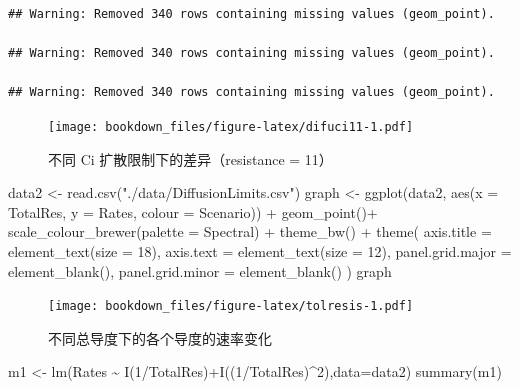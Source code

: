 \documentclass[
]{krantz}
\makeatletter
\newenvironment{Shaded}{\begin{snugshade}}{\end{snugshade}}
\newcommand{\AttributeTok}[1]{\textcolor[rgb]{0.77,0.63,0.00}{#1}}
\newcommand{\DecValTok}[1]{\textcolor[rgb]{0.00,0.00,0.81}{#1}}
\newcommand{\FunctionTok}[1]{\textcolor[rgb]{0.00,0.00,0.00}{#1}}
\newcommand{\NormalTok}[1]{#1}
\newcommand{\OtherTok}[1]{\textcolor[rgb]{0.56,0.35,0.01}{#1}}
\newcommand{\SpecialCharTok}[1]{\textcolor[rgb]{0.00,0.00,0.00}{#1}}
\newcommand{\StringTok}[1]{\textcolor[rgb]{0.31,0.60,0.02}{#1}}
\newenvironment{kframe}{%
\medskip{}
\setlength{\fboxsep}{.8em}
 \def\at@end@of@kframe{}%
 \ifinner\ifhmode%
  \def\at@end@of@kframe{\end{minipage}}%
  \begin{minipage}{\columnwidth}%
 \fi\fi%
 \def\FrameCommand##1{\hskip\@totalleftmargin \hskip-\fboxsep
 \colorbox{shadecolor}{##1}\hskip-\fboxsep
     \hskip-\linewidth \hskip-\@totalleftmargin \hskip\columnwidth}%
 \MakeFramed {\advance\hsize-\width
   \@totalleftmargin\z@ \linewidth\hsize
   \@setminipage}}%
 {\par\unskip\endMakeFramed%
 \at@end@of@kframe}
\renewenvironment{Shaded}{\begin{kframe}}{\end{kframe}}
\makeatother
\begin{document}
\begin{verbatim}
## Warning: Removed 340 rows containing missing values (geom_point).

## Warning: Removed 340 rows containing missing values (geom_point).

## Warning: Removed 340 rows containing missing values (geom_point).
\end{verbatim}

\begin{figure}
\centering
\texttt{[image: bookdown\_files/figure-latex/difuci11-1.pdf]}
\caption{\label{fig:difuci11}不同 Ci 扩散限制下的差异（resistance = 11）}
\end{figure}

\begin{Shaded}
\begin{Highlighting}[]
\NormalTok{data2 }\OtherTok{\textless{}{-}} \FunctionTok{read.csv}\NormalTok{(}\StringTok{"./data/DiffusionLimits.csv"}\NormalTok{)}
\NormalTok{graph }\OtherTok{\textless{}{-}} \FunctionTok{ggplot}\NormalTok{(data2, }\FunctionTok{aes}\NormalTok{(}\AttributeTok{x =}\NormalTok{ TotalRes, }\AttributeTok{y =}\NormalTok{ Rates, }\AttributeTok{colour =}\NormalTok{ Scenario)) }\SpecialCharTok{+}
  \FunctionTok{geom\_point}\NormalTok{()}\SpecialCharTok{+}
  \FunctionTok{scale\_colour\_brewer}\NormalTok{(}\AttributeTok{palette =} \StringTok{\textquotesingle{}Spectral\textquotesingle{}}\NormalTok{) }\SpecialCharTok{+}
  \FunctionTok{theme\_bw}\NormalTok{() }\SpecialCharTok{+}
  \FunctionTok{theme}\NormalTok{(}
    \AttributeTok{axis.title =} \FunctionTok{element\_text}\NormalTok{(}\AttributeTok{size =} \DecValTok{18}\NormalTok{),}
    \AttributeTok{axis.text =} \FunctionTok{element\_text}\NormalTok{(}\AttributeTok{size =} \DecValTok{12}\NormalTok{),}
    \AttributeTok{panel.grid.major =} \FunctionTok{element\_blank}\NormalTok{(),}
    \AttributeTok{panel.grid.minor =} \FunctionTok{element\_blank}\NormalTok{()}
\NormalTok{  )}
\NormalTok{graph}
\end{Highlighting}
\end{Shaded}

\begin{figure}
\centering
\texttt{[image: bookdown\_files/figure-latex/tolresis-1.pdf]}
\caption{\label{fig:tolresis}不同总导度下的各个导度的速率变化}
\end{figure}

\begin{Shaded}
\begin{Highlighting}[]
\NormalTok{m1 }\OtherTok{\textless{}{-}} \FunctionTok{lm}\NormalTok{(Rates }\SpecialCharTok{\textasciitilde{}} \FunctionTok{I}\NormalTok{(}\DecValTok{1}\SpecialCharTok{/}\NormalTok{TotalRes)}\SpecialCharTok{+}\FunctionTok{I}\NormalTok{((}\DecValTok{1}\SpecialCharTok{/}\NormalTok{TotalRes)}\SpecialCharTok{\^{}}\DecValTok{2}\NormalTok{),}\AttributeTok{data=}\NormalTok{data2)}
\FunctionTok{summary}\NormalTok{(m1)}
\end{Highlighting}
\end{Shaded}
\end{document}
